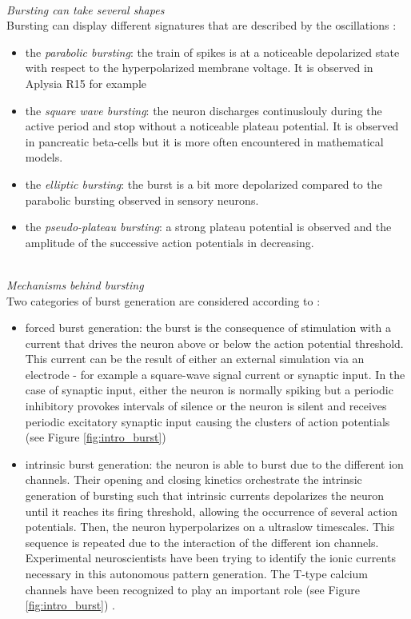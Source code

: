 ~\\
\textit{Bursting can take several shapes}\\
Bursting can display different signatures that are described by the oscillations \citep{desroches_classification_2022, drion_novel_2012, van_pottelbergh_robust_2018, smith_fourier_2000}: 
\begin{itemize}
    \item  the \textit{parabolic bursting}: the train of spikes is at a noticeable depolarized state with respect to the hyperpolarized membrane voltage. It is observed in Aplysia R15 for example \citep{adams_slow_1985, turrigiano_selective_1995}
    \item the \textit{square wave bursting}: the neuron discharges continuslouly during the active period and stop without a noticeable plateau potential. It is observed in pancreatic beta-cells \citep{bertram_phantom_2008} but it is more often encountered in mathematical models. 
    \item the \textit{elliptic bursting}: the burst is a bit more depolarized compared to the parabolic bursting observed in sensory neurons.
    \item the \textit{pseudo-plateau bursting}: a strong plateau potential is observed and the amplitude of the successive action potentials in decreasing. 
\end{itemize}

~\\
\textit{Mechanisms behind bursting}\\
Two categories of burst generation are considered according to \citep{jeong_bursting_2012,jeong_bursting_2012} : 
\begin{itemize}
    \item forced burst generation: the burst is the consequence of stimulation with a current that drives the neuron above or below the action potential threshold. This current can be the result of either an external simulation via an electrode - for example a square-wave signal current or synaptic input. In the case of synaptic input, either the neuron is normally spiking but a periodic inhibitory provokes intervals of silence or the neuron is silent and receives periodic excitatory synaptic input causing the clusters of action potentials (see Figure \ref{fig:intro_burst}) 
    \item intrinsic burst generation: the neuron is able to burst due to the different ion channels. Their opening and closing kinetics orchestrate the intrinsic generation of bursting such that intrinsic currents depolarizes the neuron until it reaches its firing threshold, allowing the occurrence of several action potentials. Then, the neuron hyperpolarizes on a ultraslow timescales. This sequence is repeated due to the interaction of the different ion channels. Experimental neuroscientists have been trying to identify the ionic currents necessary in this autonomous pattern generation. The T-type calcium channels have been recognized to play an important role \citep{cain_contributions_2010} (see Figure \ref{fig:intro_burst}) . 
\end{itemize}



